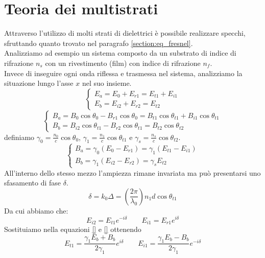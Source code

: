 \documentclass{article}
\begin{document}
\section{Teoria dei multistrati}
Attraverso l'utilizzo di molti strati di dielettrici è possibile realizzare specchi, sfruttando quanto trovato nel paragrafo \ref{section:eq_fresnel}.\\
Analizziamo ad esempio un sistema composto da un substrato di indice di rifrazione $n_s$ con un rivestimento (film) con indice di rifrazione $n_f$.\\
Invece di inseguire ogni onda riflessa e trasmessa nel sistema, analizziamo la situazione lungo l'asse $x$ nel suo insieme.
\begin{equation}
\begin{cases}
E_a = E_0 + E_{r1} = E_{t1} + E_{i1}\\
E_b = E_{i2} + E_{r2} = E_{t2}
\end{cases}
\end{equation}
\begin{equation*}
\begin{cases}
B_a = B_0 \cos \theta_0 - B_{r1} \cos \theta_0 = B_{t1} \cos \theta_{t1} + B_{i1} \cos \theta_{t1} \\
B_b = B_{i2} \cos \theta_{t1} - B_{r2} \cos \theta_{t1} = B_{t2} \cos \theta_{t2}
\end{cases}
\end{equation*}
definiamo $\gamma_0 = \frac{n_0}{c} \cos \theta_0$, $\gamma_1 = \frac{n_1}{c} \cos \theta_{t1}$ e $\gamma_s = \frac{n_s}{c} \cos \theta_{t2}$.
\begin{equation}
\begin{cases}
B_a = \gamma_0 (E_0 - E_{r1}) = \gamma_1 (E_{t1} - E_{i1})\\
B_b = \gamma_1 (E_{i2} - E_{r2}) = \gamma_s E_{t2}
\end{cases}
\end{equation}
All'interno dello stesso mezzo l'ampiezza rimane invariata ma può presentarsi uno sfasamento di fase $\delta$.
\begin{equation}
\delta = k_0 \Delta = (\frac{2\pi}{\lambda_0}) n_1 d \cos \theta_{t1}
\end{equation}
Da cui abbiamo che:
\begin{equation}
E_{i2} = E_{t1} e^{-i \delta} \qquad E_{i1} = E_{r1} e^{i \delta}
\end{equation}
Sostituiamo nella equazioni \eqref{} e \eqref{} ottenendo
\begin{equation}
E_{t1} = \frac{\gamma_1 E_b + B_b}{2 \gamma_1}e^{i\delta} \qquad E_{i1} = \frac{\gamma_1 E_b - B_b}{2 \gamma_1}e^{-i\delta}
\end{equation}
\end{document}
